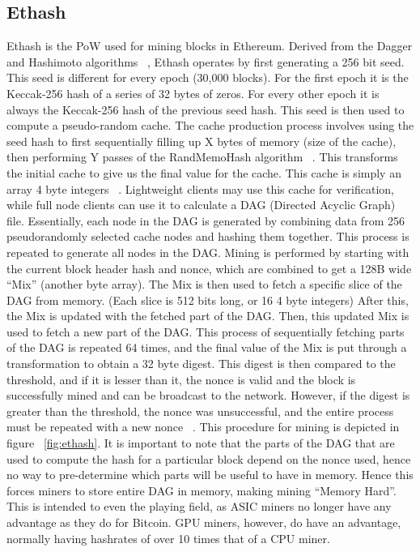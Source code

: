 \documentclass[runningheads]{llncs}
\begin{document}
\subsection{Ethash}
Ethash is the PoW used for mining blocks in Ethereum. Derived from the Dagger and Hashimoto algorithms ~\cite{dagger-hashimoto}, Ethash operates by first generating a 256 bit seed. This seed is different for every epoch (30,000 blocks). For the first epoch it is the Keccak-256 hash of a series of 32 bytes of zeros. For every other epoch it is always the Keccak-256 hash of the previous seed hash. This seed is then used to compute a pseudo-random cache. The cache production process involves using the seed hash to first sequentially filling up X bytes of memory (size of the cache), then performing Y passes of the RandMemoHash algorithm ~\cite{randmemohash}. This transforms the initial cache to give us the final value for the cache. This cache is simply an array 4 byte integers ~\cite{Ethmining}. Lightweight clients may use this cache for verification, while full node clients can use it to calculate a DAG (Directed Acyclic Graph) file. Essentially, each node in the DAG is generated by combining data from 256 pseudorandomly selected cache nodes and hashing them together. This process is repeated to generate all nodes in the DAG. Mining is performed by starting with the current block header hash and nonce, which are combined to get a 128B wide ``Mix'' (another byte array). The Mix is then used to fetch a specific slice of the DAG from memory. (Each slice is 512 bits long, or 16 4 byte integers) After this, the Mix is updated with the fetched part of the DAG. Then, this updated Mix is used to fetch a new part of the DAG. This process of sequentially fetching parts of the DAG is repeated 64 times, and the final value of the Mix is put through a transformation to obtain a 32 byte digest. This digest is then compared to the threshold, and if it is lesser than it, the nonce is valid and the block is successfully mined and can be broadcast to the network. However, if the digest is greater than the threshold, the nonce was unsuccessful, and the entire process must be repeated with a new nonce ~\cite{Ethmining}. This procedure for mining is depicted in figure ~\ref{fig:ethash}. It is important to note that the parts of the DAG that are used to compute the hash for a particular block depend on the nonce used, hence no way to pre-determine which parts will be useful to have in memory. Hence this forces miners to store entire DAG in memory, making mining ``Memory Hard''. This is intended to even the playing field, as ASIC miners no longer have any advantage as they do for Bitcoin. GPU miners, however, do have an advantage, normally having hashrates of over 10 times that of a CPU miner.
\end{document}
